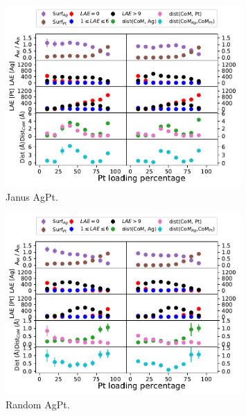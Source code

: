 \begin{figure}
    \centering
    \includegraphics[width=0.8\textwidth]{figures/MD/Alloys/Janus_Ag-Pt.pdf}
    \caption{Janus AgPt.}
    \label{fig:AgPtJan_Dyn}
\end{figure}

\begin{figure}
    \centering
    \includegraphics[width=0.8\textwidth]{figures/MD/Alloys/Random_Ag-Pt.pdf}
    \caption{Random AgPt.}
    \label{fig:AgPtRnd_Dyn}
\end{figure}

